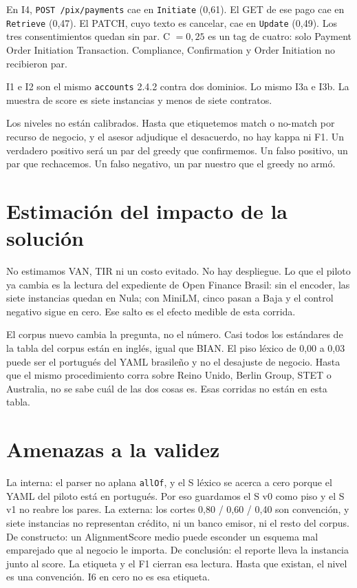 En I4, \texttt{POST /pix/payments} cae en \texttt{Initiate} (0,61). El GET de ese pago cae en \texttt{Retrieve} (0,47). El PATCH, cuyo texto es cancelar, cae en \texttt{Update} (0,49). Los tres consentimientos quedan sin par. C $= 0{,}25$ es un tag de cuatro: solo Payment Order Initiation Transaction. Compliance, Confirmation y Order Initiation no recibieron par.

I1 e I2 son el mismo \texttt{accounts} 2.4.2 contra dos dominios. Lo mismo I3a e I3b. La muestra de score es siete instancias y menos de siete contratos.

Los niveles no están calibrados. Hasta que etiquetemos match o no-match por recurso de negocio, y el asesor adjudique el desacuerdo, no hay kappa ni F1. Un verdadero positivo será un par del greedy que confirmemos. Un falso positivo, un par que rechacemos. Un falso negativo, un par nuestro que el greedy no armó.

\section{Estimación del impacto de la solución}

No estimamos VAN, TIR ni un costo evitado. No hay despliegue. Lo que el piloto ya cambia es la lectura del expediente de Open Finance Brasil: sin el encoder, las siete instancias quedan en Nula; con MiniLM, cinco pasan a Baja y el control negativo sigue en cero. Ese salto es el efecto medible de esta corrida.

El corpus nuevo cambia la pregunta, no el número. Casi todos los estándares de la tabla del corpus están en inglés, igual que BIAN. El piso léxico de 0,00 a 0,03 puede ser el portugués del YAML brasileño y no el desajuste de negocio. Hasta que el mismo procedimiento corra sobre Reino Unido, Berlin Group, STET o Australia, no se sabe cuál de las dos cosas es. Esas corridas no están en esta tabla.

\section{Amenazas a la validez}

La interna: el parser no aplana \texttt{allOf}, y el S léxico se acerca a cero porque el YAML del piloto está en portugués. Por eso guardamos el S v0 como piso y el S v1 no reabre los pares. La externa: los cortes 0,80 / 0,60 / 0,40 son convención, y siete instancias no representan crédito, ni un banco emisor, ni el resto del corpus. De constructo: un AlignmentScore medio puede esconder un esquema mal emparejado que al negocio le importa. De conclusión: el reporte lleva la instancia junto al score. La etiqueta y el F1 cierran esa lectura. Hasta que existan, el nivel es una convención. I6 en cero no es esa etiqueta.
